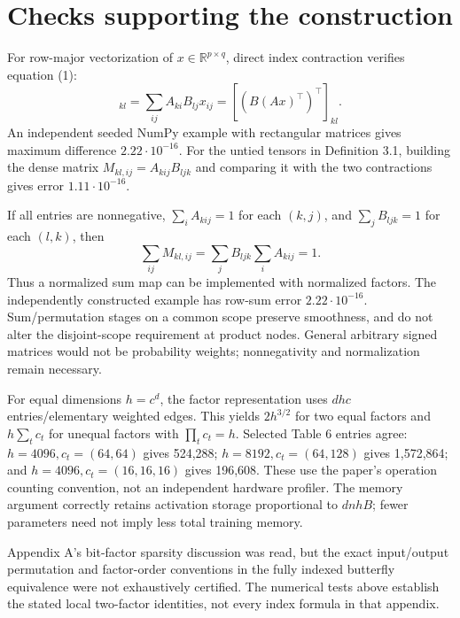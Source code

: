 \documentclass[10pt]{article}
\begin{document}
\section*{Checks supporting the construction}
For row-major vectorization of \(x\in\mathbb R^{p\times q}\), direct index contraction verifies equation (1): \[_{kl}
 =\sum_{ij}A_{ki}B_{lj}x_{ij}=[(B(Ax)^\top)^\top]_{kl}.\] An independent seeded NumPy example with rectangular matrices gives maximum difference \(2.22\cdot10^{-16}\). For the untied tensors in Definition 3.1, building the dense matrix \(M_{kl,ij}=A_{kij}B_{ljk}\) and comparing it with the two contractions gives error \(1.11\cdot10^{-16}\).\par
If all entries are nonnegative, \(\sum_iA_{kij}=1\) for each \((k,j)\), and \(\sum_jB_{ljk}=1\) for each \((l,k)\), then \[\sum_{ij}M_{kl,ij}=\sum_jB_{ljk}\sum_iA_{kij}=1.\] Thus a normalized sum map can be implemented with normalized factors. The independently constructed example has row-sum error \(2.22\cdot10^{-16}\). Sum/permutation stages on a common scope preserve smoothness, and do not alter the disjoint-scope requirement at product nodes. General arbitrary signed matrices would not be probability weights; nonnegativity and normalization remain necessary.\par
For equal dimensions \(h=c^d\), the factor representation uses \(dhc\) entries/elementary weighted edges. This yields \(2h^{3/2}\) for two equal factors and \(h\sum_t c_t\) for unequal factors with \(\prod_tc_t=h\). Selected Table 6 entries agree: \(h=4096,c_t=(64,64)\) gives 524,288; \(h=8192,c_t=(64,128)\) gives 1,572,864; and \(h=4096,c_t=(16,16,16)\) gives 196,608. These use the paper’s operation counting convention, not an independent hardware profiler. The memory argument correctly retains activation storage proportional to \(dnhB\); fewer parameters need not imply less total training memory.\par
Appendix A’s bit-factor sparsity discussion was read, but the exact input/output permutation and factor-order conventions in the fully indexed butterfly equivalence were not exhaustively certified. The numerical tests above establish the stated local two-factor identities, not every index formula in that appendix.\par
\end{document}
